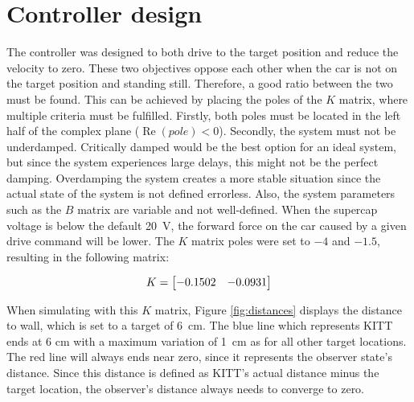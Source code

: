 \documentclass[final]{scrreprt} %
\begin{document}
\section*{Controller design}
The controller was designed to both drive to the target position and reduce the velocity to zero.
These two objectives oppose each other when the car is not on the target position and standing still.
Therefore, a good ratio between the two must be found.
This can be achieved by placing the poles of the $K$ matrix, where multiple criteria must be fulfilled.
Firstly, both poles must be located in the left half of the complex plane ($\operatorname{Re}(pole) < 0$).
Secondly, the system must not be underdamped.
Critically damped would be the best option for an ideal system, but since the system experiences large delays, this might not be the perfect damping.
Overdamping the system creates a more stable situation since the actual state of the system is not defined errorless.
Also, the system parameters such as the $B$ matrix are variable and not well-defined.
When the supercap voltage is below the default \SI{20}{\volt}, the forward force on the car caused by a given drive command will be lower.
The $K$ matrix poles were set to $-4$ and $-1.5$, resulting in the following matrix:

\begin{equation}
\centering
K = 
\begin{bmatrix}
  -0.1502 & -0.0931
\end{bmatrix}
\end{equation}

When simulating with this $K$ matrix, Figure \ref{fig:distances} displays the distance to wall, which is set to a target of \SI{6}{\centi\metre}.
The blue line which represents KITT ends at 6 cm with a maximum variation of \SI{1}{\centi\metre} as for all other target locations.
The red line will always ends near zero, since it represents the observer state's distance.
Since this distance is defined as KITT's actual distance minus the target location, the observer's distance always needs to converge to zero.
\end{document}
